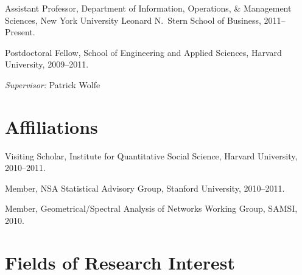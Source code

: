 \documentclass[10pt,letterpaper]{article}
\renewenvironment{itemize}{
  \begin{list}{}{
    \setlength{\leftmargin}{1.5em}
    \setlength{\itemsep}{0.25em}
    \setlength{\parskip}{0pt}
    \setlength{\parsep}{0.25em}
  }
}{
  \end{list}
}
\begin{document}
\begin{itemize}
\item Assistant Professor, Department of Information, Operations, \&
  Management Sciences, New York University Leonard N.~Stern School of Business,
  2011--Present.
\item Postdoctoral Fellow, School of Engineering and Applied Sciences, Harvard
  University, 2009--2011.
  \begin{itemize}
  \item \textit{Supervisor:} Patrick Wolfe
  \end{itemize}
\end{itemize}




\section*{Affiliations}
\begin{itemize}
\item Visiting Scholar, Institute for Quantitative Social Science, Harvard University, 2010--2011.
\item Member, NSA Statistical Advisory Group, Stanford University, 2010--2011.
\item Member, Geometrical/Spectral Analysis of Networks Working Group, SAMSI, 2010.
\end{itemize}


\section*{Fields of Research Interest}
\end{document}
